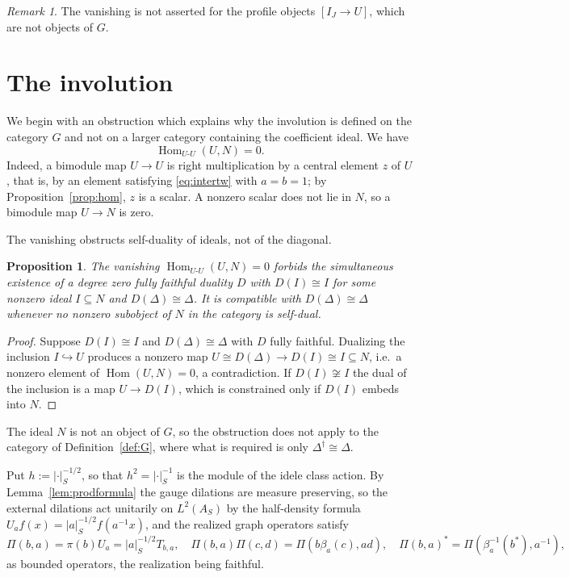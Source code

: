 \documentclass[11pt]{amsart}
\newtheorem{proposition}[theorem]{Proposition}
\theoremstyle{definition}
\theoremstyle{remark}
\newtheorem{remark}[theorem]{Remark}
\newcommand{\Hom}{\operatorname{Hom}}
\begin{document}
\begin{remark}
The vanishing is not asserted for the profile objects $[I_J\to U]$, which are
not objects of $G$.
\end{remark}

\section{The involution}\label{sec:dagger}

We begin with an obstruction which explains why the involution is defined on
the category $G$ and not on a larger category containing the coefficient
ideal.  We have
\begin{equation}\label{eq:HomUN}
\Hom_{U\text{-}U}(U,N)=0 .
\end{equation}
Indeed, a bimodule map $U\to U$ is right multiplication by a central element
$z$ of $U$, that is, by an element satisfying \eqref{eq:intertw} with $a=b=1$;
by Proposition~\ref{prop:hom}, $z$ is a scalar.  A nonzero scalar does not lie
in $N$, so a bimodule map $U\to N$ is zero.

The vanishing obstructs self-duality of ideals, not of the diagonal.

\begin{proposition}\label{prop:obstruction}
The vanishing $\Hom_{U\text{-}U}(U,N)=0$ forbids the simultaneous existence of
a degree zero fully faithful duality $D$ with $D(I)\cong I$ for some nonzero
ideal $I\subseteq N$ and $D(\Delta)\cong\Delta$.  It is compatible with
$D(\Delta)\cong\Delta$ whenever no nonzero subobject of $N$ in the category is
self-dual.
\end{proposition}

\begin{proof}
Suppose $D(I)\cong I$ and $D(\Delta)\cong\Delta$ with $D$ fully faithful.
Dualizing the inclusion $I\hookrightarrow U$ produces a nonzero map
$U\cong D(\Delta)\to D(I)\cong I\subseteq N$, i.e.\ a nonzero element of
$\Hom(U,N)=0$, a contradiction.  If $D(I)\not\cong I$ the dual of the
inclusion is a map $U\to D(I)$, which is constrained only if $D(I)$ embeds
into $N$.
\end{proof}

The ideal $N$ is not an object of $G$, so the
obstruction does not apply to the category of Definition~\ref{def:G}, where
what is required is only $\Delta^{\dagger}\cong\Delta$.

Put $h:=|\cdot|_S^{-1/2}$, so that $h^{2}=|\cdot|_S^{-1}$ is the module of the
idele class action.  By Lemma~\ref{lem:prodformula} the gauge dilations are
measure preserving, so the external dilations act unitarily on $L^{2}(A_S)$ by
the half-density formula $U_af(x)=|a|_S^{-1/2}f(a^{-1}x)$, and the realized
graph operators satisfy
\begin{equation}\label{eq:graphops}
\Pi(b,a)=\pi(b)U_a=|a|_S^{-1/2}T_{b,a},\quad
\Pi(b,a)\Pi(c,d)=\Pi(b\beta_a(c),ad),\quad
\Pi(b,a)^{*}=\Pi(\beta_a^{-1}(b^{*}),a^{-1}),
\end{equation}
as bounded operators, the realization being faithful.
\end{document}
